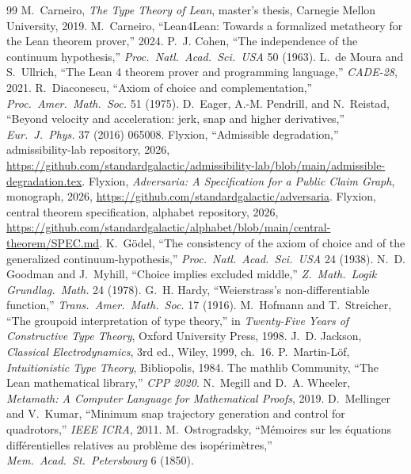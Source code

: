 \documentclass[11pt]{article}
\begin{document}
\begin{thebibliography}{99}
 M.~Carneiro, \emph{The Type Theory of Lean}, master's thesis, Carnegie Mellon University, 2019.
 M.~Carneiro, ``Lean4Lean: Towards a formalized metatheory for the Lean theorem prover,'' 2024.
 P.~J. Cohen, ``The independence of the continuum hypothesis,'' \emph{Proc.\ Natl.\ Acad.\ Sci.\ USA} 50 (1963).
 L.~de Moura and S.~Ullrich, ``The Lean 4 theorem prover and programming language,'' \emph{CADE-28}, 2021.
 R.~Diaconescu, ``Axiom of choice and complementation,'' \emph{Proc.\ Amer.\ Math.\ Soc.} 51 (1975).
 D.~Eager, A.-M. Pendrill, and N.~Reistad, ``Beyond velocity and acceleration: jerk, snap and higher derivatives,'' \emph{Eur.\ J.\ Phys.} 37 (2016) 065008.
 Flyxion, ``Admissible degradation,'' admissibility-lab repository, 2026, \url{https://github.com/standardgalactic/admissibility-lab/blob/main/admissible-degradation.tex}.
 Flyxion, \emph{Adversaria: A Specification for a Public Claim Graph}, monograph, 2026, \url{https://github.com/standardgalactic/adversaria}.
 Flyxion, central theorem specification, alphabet repository, 2026, \url{https://github.com/standardgalactic/alphabet/blob/main/central-theorem/SPEC.md}.
 K.~G\"odel, ``The consistency of the axiom of choice and of the generalized continuum-hypothesis,'' \emph{Proc.\ Natl.\ Acad.\ Sci.\ USA} 24 (1938).
 N.~D. Goodman and J.~Myhill, ``Choice implies excluded middle,'' \emph{Z.\ Math.\ Logik Grundlag.\ Math.} 24 (1978).
 G.~H. Hardy, ``Weierstrass's non-differentiable function,'' \emph{Trans.\ Amer.\ Math.\ Soc.} 17 (1916).
 M.~Hofmann and T.~Streicher, ``The groupoid interpretation of type theory,'' in \emph{Twenty-Five Years of Constructive Type Theory}, Oxford University Press, 1998.
 J.~D. Jackson, \emph{Classical Electrodynamics}, 3rd ed., Wiley, 1999, ch.~16.
 P.~Martin-L\"of, \emph{Intuitionistic Type Theory}, Bibliopolis, 1984.
 The mathlib Community, ``The Lean mathematical library,'' \emph{CPP 2020}.
 N.~Megill and D.~A. Wheeler, \emph{Metamath: A Computer Language for Mathematical Proofs}, 2019.
 D.~Mellinger and V.~Kumar, ``Minimum snap trajectory generation and control for quadrotors,'' \emph{IEEE ICRA}, 2011.
 M.~Ostrogradsky, ``M\'emoires sur les \'equations diff\'erentielles relatives au probl\`eme des isop\'erim\`etres,'' \emph{Mem.\ Acad.\ St.\ Petersbourg} 6 (1850).

\end{thebibliography}
\end{document}
